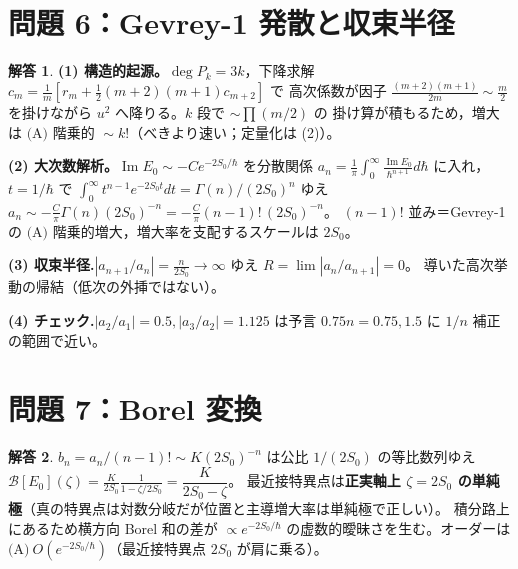 \documentclass[dvipdfmx, uplatex]{jsarticle}
\newcommand{\hb}{\hbar}
\newcommand{\Bor}{\mathcal{B}}
\theoremstyle{definition}
\newtheorem*{sol}{解答}
\begin{document}
\section{問題 6：Gevrey-1 発散と収束半径}

\begin{sol}
\textbf{(1) 構造的起源。}$\deg P_k=3k$，下降求解 $c_m=\tfrac1m[r_m+\tfrac12(m+2)(m+1)c_{m+2}]$ で
高次係数が因子 $\tfrac{(m+2)(m+1)}{2m}\sim\tfrac m2$ を掛けながら $u^2$ へ降りる。$k$ 段で $\sim\prod(m/2)$ の
掛け算が積もるため，増大は $\boxed{\text{(A) 階乗的 }\sim k!}$（べきより速い；定量化は (2)）。

\textbf{(2) 大次数解析。}$\operatorname{Im}E_0\sim-Ce^{-2S_0/\hb}$ を分散関係
$a_n=\tfrac1\pi\int_0^\infty\frac{\operatorname{Im}E_0}{\hb^{n+1}}d\hb$ に入れ，$t=1/\hb$ で
$\int_0^\infty t^{n-1}e^{-2S_0t}dt=\Gamma(n)/(2S_0)^n$ ゆえ
$\boxed{a_n\sim-\tfrac{C}{\pi}\Gamma(n)(2S_0)^{-n}=-\tfrac{C}{\pi}(n-1)!\,(2S_0)^{-n}}$。
$(n-1)!$ 並み＝Gevrey-1 の $\boxed{\text{(A) 階乗的増大}}$，増大率を支配するスケールは $\boxed{2S_0}$。

\textbf{(3) 収束半径.}$|a_{n+1}/a_n|=\tfrac{n}{2S_0}\to\infty$ ゆえ $\boxed{R=\lim|a_n/a_{n+1}|=0}$。
導いた高次挙動の帰結（低次の外挿ではない）。

\textbf{(4) チェック.}$|a_2/a_1|=0.5,|a_3/a_2|=1.125$ は予言 $0.75n=0.75,1.5$ に $1/n$ 補正の範囲で近い。
\end{sol}

\section{問題 7：Borel 変換}

\begin{sol}
$b_n=a_n/(n-1)!\sim K(2S_0)^{-n}$ は公比 $1/(2S_0)$ の等比数列ゆえ
$\Bor[E_0](\zeta)=\tfrac{K}{2S_0}\tfrac{1}{1-\zeta/2S_0}=\boxed{\dfrac{K}{2S_0-\zeta}}$。
最近接特異点は\textbf{正実軸上 $\zeta=2S_0$ の単純極}（真の特異点は対数分岐だが位置と主導増大率は単純極で正しい）。
積分路上にあるため横方向 Borel 和の差が $\propto e^{-2S_0/\hb}$ の虚数的曖昧さを生む。オーダーは
$\boxed{\text{(A)}\ O(e^{-2S_0/\hb})}$（最近接特異点 $2S_0$ が肩に乗る）。
\end{sol}

\end{document}

